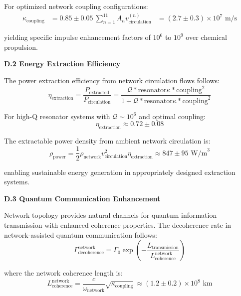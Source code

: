 \documentclass[11pt,a4paper]{article}
\begin{document}
For optimized network coupling configurations:
\begin{align}
\kappa_{\text{coupling}} &= 0.85 \pm 0.05 \
\sum_{n=1}^{11} A_n v_{\text{circulation}}^{(n)} &= (2.7 \pm 0.3) \times 10^7 \text{ m/s}
\label{eq:optimized_coupling_parameters}
\end{align}

yielding specific impulse enhancement factors of $10^6$ to $10^9$ over chemical propulsion.

\textbf{D.2 Energy Extraction Efficiency}

The power extraction efficiency from network circulation flows follows:
\begin{equation}
\eta_{\text{extraction}} = \frac{P_{\text{extracted}}}{P_{\text{circulation}}} = \frac{\mathcal{Q}*{\text{resonator}} \kappa*{\text{coupling}}^2}{1 + \mathcal{Q}*{\text{resonator}} \kappa*{\text{coupling}}^2}
\label{eq:extraction_efficiency}
\end{equation}

For high-Q resonator systems with $\mathcal{Q} \sim 10^6$ and optimal coupling:
\begin{equation}
\eta_{\text{extraction}} \approx 0.72 \pm 0.08
\label{eq:maximum_extraction_efficiency}
\end{equation}

The extractable power density from ambient network circulation is:
\begin{equation}
\rho_{\text{power}} = \frac{1}{2}\rho_{\text{network}} v_{\text{circulation}}^2 \eta_{\text{extraction}} \approx 847 \pm 95 \text{ W/m}^3
\label{eq:power_density}
\end{equation}

enabling sustainable energy generation in appropriately designed extraction systems.

\textbf{D.3 Quantum Communication Enhancement}

Network topology provides natural channels for quantum information transmission with enhanced coherence properties. The decoherence rate in network-assisted quantum communication follows:
\begin{equation}
\Gamma_{\text{decoherence}}^{\text{network}} = \Gamma_0 \exp\left(-\frac{L_{\text{transmission}}}{L_{\text{coherence}}^{\text{network}}}\right)
\label{eq:network_decoherence_rate}
\end{equation}

where the network coherence length is:
\begin{equation}
L_{\text{coherence}}^{\text{network}} = \frac{c}{\omega_{\text{network}}} \sqrt{\kappa_{\text{coupling}}} \approx (1.2 \pm 0.2) \times 10^8 \text{ km}
\label{eq:network_coherence_length}
\end{equation}
\end{document}
